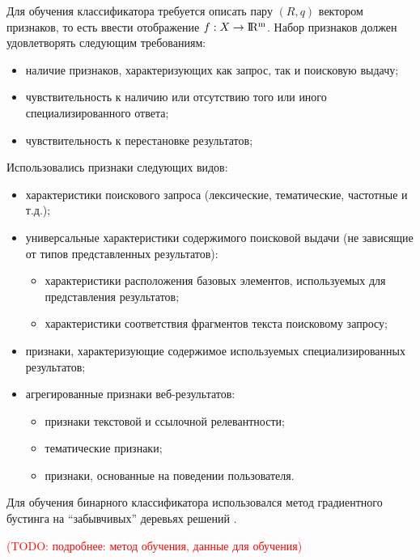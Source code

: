 \documentclass[12pt,a4paper]{report}
\newcommand\note[1]{\textcolor{red}{(#1)}}
\newcommand\todonote[1]{\note{TODO: #1}}
\newcommand*\mathR[0]{\rm I\!R}
\begin{document}
Для обучения классификатора требуется описать пару $(R, q)$ вектором признаков, то есть ввести отображение $f: X \rightarrow \mathR^m$. Набор признаков должен удовлетворять следующим требованиям:
\begin{itemize}
\item наличие признаков, характеризующих как запрос, так и поисковую выдачу;
\item чувствительность к наличию или отсутствию того или иного специализированного ответа;
\item чувствительность к перестановке результатов;
\end{itemize} 
Использовались признаки следующих видов:
\begin{itemize}
\item характеристики поискового запроса (лексические, тематические, частотные и т.д.);
\item универсальные характеристики содержимого поисковой выдачи (не зависящие от типов представленных результатов):
  \begin{itemize}
  \item характеристики расположения базовых элементов, используемых для представления результатов;
  \item характеристики соответствия фрагментов текста поисковому запросу;  
  \end{itemize}   
\item признаки, характеризующие содержимое используемых специализированных результатов;
\item агрегированные признаки веб-результатов:
  \begin{itemize}
  \item признаки текстовой и ссылочной релевантности;
  \item тематические признаки;
  \item признаки, основанные на поведении пользователя.
  \end{itemize}     
\end{itemize} 

Для обучения бинарного классификатора использовался метод градиентного бустинга \cite{ESL, MatrixNet, BoostingOverview} на ``забывчивых'' деревьях решений \cite{ODT}.  

\todonote{подробнее: метод обучения, данные для обучения}
\end{document}
